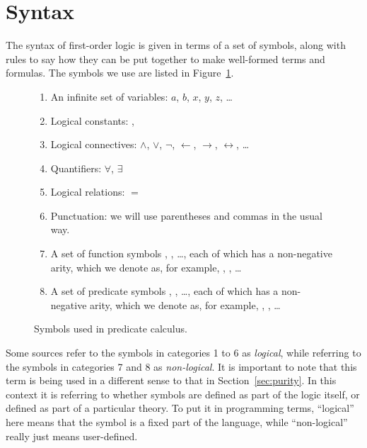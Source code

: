 \section{Syntax}
\label{sec:syntax}

The syntax of first-order logic is given in terms of a set of symbols,
along with rules to say how they can be put together
to make well-formed terms and formulas.
The symbols we use are listed in Figure~\ref{fig:symbols}.

\begin{figure}
\begin{enumerate}
\item
An infinite set of variables:
$a$, $b$, $x$, $y$, $z$, \ldots{}
\item
Logical constants:
\true, \false
\item
Logical connectives:
$\land$, $\lor$, $\lnot$, $\leftarrow$, $\rightarrow$,
$\leftrightarrow$, \ldots
\item
Quantifiers:
$\forall$, $\exists$
\item
Logical relations: $=$
\item
Punctuation: we will use parentheses and commas in the usual way.
\item
A set of function symbols
, , \ldots,
each of which has a non-negative arity,
which we denote as, for example,
, , \ldots
\item
A set of predicate symbols
, , \ldots,
each of which has a non-negative arity,
which we denote as, for example,
, , \ldots
\end{enumerate}
\caption{Symbols used in predicate calculus.\label{fig:symbols}}
\end{figure}

Some sources refer to the symbols in categories 1 to 6
as \emph{logical},
while referring to the symbols in categories 7 and 8 as
\emph{non-logical\label{gi:non-logical2}}.
It is important to note that
this term is being used in a different sense
to that in Section~\ref{sec:purity}.
In this context it is referring to whether symbols are
defined as part of the logic itself,
or defined as part of a particular theory.
To put it in programming terms,
``logical'' here means that
the symbol is a fixed part of the language,
while ``non-logical'' really just means user-defined.

